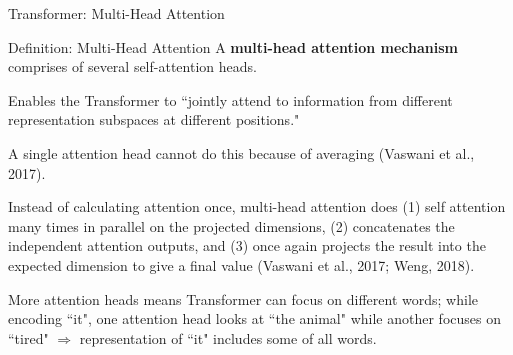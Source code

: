 \begin{frame}{Transformer: Multi-Head Attention}
    
    \begin{definitionBlock}{Definition: Multi-Head Attention}
        A \textbf{\alert{multi-head attention mechanism}} comprises of several self-attention heads. 
        
        Enables the Transformer to ``jointly attend to information from different representation subspaces at different positions." 
        
        A single attention head cannot do this because of averaging (Vaswani et al., 2017).
    \end{definitionBlock}
    
    \begin{itemizeSpaced}{4pt}
        \pinkbox Instead of calculating attention once, multi-head attention does (1) self attention many times in parallel on the projected dimensions, (2) concatenates the independent attention outputs, and (3) once again projects the result into the expected dimension to give a final value (Vaswani et al., 2017; Weng, 2018).
        
        \pinkbox More attention heads means Transformer can focus on different words; while encoding ``it", one attention head looks at ``the animal" while another focuses on ``tired" $\Rightarrow$ representation of ``it" includes some of all words. 
    \end{itemizeSpaced}
    
\end{frame}





